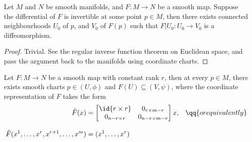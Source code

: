 \documentclass[../main-v2-manifolds.tex]{subfiles}
\begin{document}
\begin{wts}\label{lee-chp4:inverse-theorem-on-manifolds}
    Let $M$ and $N$ be smooth manifolds, and $F:M\to N$ be a smooth map. Suppose the differential of $F$ is invertible at some point $p\in M$, then there exists connected neighbourhoods $U_0$ of $p$, and $V_0$ of $F(p)$ such that $F|U_0:U_0\to V_0$ is a diffeomorphism.
\end{wts}
\begin{proof}
    Trivial. See the regular inverse function theorem  on Euclidean space, and pass the argument back to the manifolds using coordinate charts.
\end{proof}
\begin{wts}\label{lee-chp4:rank-theorem-for-manifolds}
    Let $F:M\to N$ be a smooth map with constant rank $r$, then at every $p\in M$, there exists smooth charts $p\in (U,\phi)$ and $F(U)\subseteq(V,\psi)$, where the coordinate representation of $F$ takes the form
    \begin{align}\label{lee-chp4:rank-theorem-regular-case-coordinate-representation}
        \hat{F}(x) &= \begin{bmatrix}
            \id{r\times r} & 0_{r\times m-r}\\
            0_{n-r\times r} & 0_{n-r\times m-r}
        \end{bmatrix}x, && \qq{or equivalently}\\[2ex]
        \hat{F}(x^1,\ldots,x^r,x^{r+1},\ldots,x^m)&=(x^1,\ldots,x^r)
    \end{align}
\end{wts}
\end{document}
